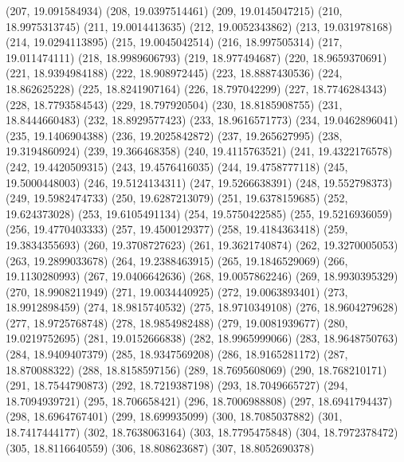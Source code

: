 {					(207, 19.091584934)
					(208, 19.0397514461)
					(209, 19.0145047215)
					(210, 18.9975313745)
					(211, 19.0014413635)
					(212, 19.0052343862)
					(213, 19.031978168)
					(214, 19.0294113895)
					(215, 19.0045042514)
					(216, 18.997505314)
					(217, 19.011474111)
					(218, 18.9989606793)
					(219, 18.977494687)
					(220, 18.9659370691)
					(221, 18.9394984188)
					(222, 18.908972445)
					(223, 18.8887430536)
					(224, 18.862625228)
					(225, 18.8241907164)
					(226, 18.797042299)
					(227, 18.7746284343)
					(228, 18.7793584543)
					(229, 18.797920504)
					(230, 18.8185908755)
					(231, 18.8444660483)
					(232, 18.8929577423)
					(233, 18.9616571773)
					(234, 19.0462896041)
					(235, 19.1406904388)
					(236, 19.2025842872)
					(237, 19.265627995)
					(238, 19.3194860924)
					(239, 19.366468358)
					(240, 19.4115763521)
					(241, 19.4322176578)
					(242, 19.4420509315)
					(243, 19.4576416035)
					(244, 19.4758777118)
					(245, 19.5000448003)
					(246, 19.5124134311)
					(247, 19.5266638391)
					(248, 19.552798373)
					(249, 19.5982474733)
					(250, 19.6287213079)
					(251, 19.6378159685)
					(252, 19.624373028)
					(253, 19.6105491134)
					(254, 19.5750422585)
					(255, 19.5216936059)
					(256, 19.4770403333)
					(257, 19.4500129377)
					(258, 19.4184363418)
					(259, 19.3834355693)
					(260, 19.3708727623)
					(261, 19.3621740874)
					(262, 19.3270005053)
					(263, 19.2899033678)
					(264, 19.2388463915)
					(265, 19.1846529069)
					(266, 19.1130280993)
					(267, 19.0406642636)
					(268, 19.0057862246)
					(269, 18.9930395329)
					(270, 18.9908211949)
					(271, 19.0034440925)
					(272, 19.0063893401)
					(273, 18.9912898459)
					(274, 18.9815740532)
					(275, 18.9710349108)
					(276, 18.9604279628)
					(277, 18.9725768748)
					(278, 18.9854982488)
					(279, 19.0081939677)
					(280, 19.0219752695)
					(281, 19.0152666838)
					(282, 18.9965999066)
					(283, 18.9648750763)
					(284, 18.9409407379)
					(285, 18.9347569208)
					(286, 18.9165281172)
					(287, 18.870088322)
					(288, 18.8158597156)
					(289, 18.7695608069)
					(290, 18.768210171)
					(291, 18.7544790873)
					(292, 18.7219387198)
					(293, 18.7049665727)
					(294, 18.7094939721)
					(295, 18.706658421)
					(296, 18.7006988808)
					(297, 18.6941794437)
					(298, 18.6964767401)
					(299, 18.699935099)
					(300, 18.7085037882)
					(301, 18.7417444177)
					(302, 18.7638063164)
					(303, 18.7795475848)
					(304, 18.7972378472)
					(305, 18.8116640559)
					(306, 18.808623687)
					(307, 18.8052690378)
}
